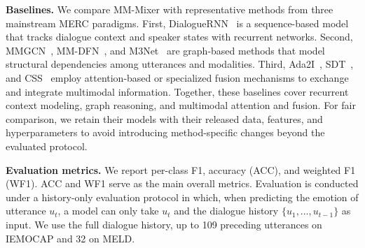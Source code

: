 \documentclass[letterpaper]{article} %
\begin{document}
\noindent\textbf{Baselines.}
We compare MM-Mixer with representative methods from three mainstream
MERC paradigms. First, DialogueRNN~\cite{dialoguernn} is a sequence-based model that tracks dialogue context and speaker states with recurrent networks. Second, MMGCN~\cite{mmgcn},
MM-DFN~\cite{mmdfn}, and M3Net~\cite{m3net} are graph-based methods that model structural dependencies among utterances and modalities. Third, Ada2I~\cite{ada2i}, SDT~\cite{sdt}, and CSS~\cite{css} employ attention-based or specialized fusion mechanisms to exchange and
integrate multimodal information. Together, these baselines cover recurrent context modeling, graph reasoning, and multimodal attention and fusion. For fair comparison, we retain their models with their released data, features, and hyperparameters to avoid introducing method-specific changes beyond the evaluated protocol.

\noindent\textbf{Evaluation metrics.}
We report per-class F1, accuracy (ACC), and weighted F1 (WF1). ACC and WF1 serve as the main overall metrics. Evaluation is conducted under a history-only evaluation protocol in which, when predicting the emotion of utterance $u_t$, a model can only take  $u_{t}$ and
the dialogue history $\{u_1,\ldots,u_{t-1}\}$ as input.
We use the full dialogue history, up to 109 preceding utterances on
IEMOCAP and 32 on MELD.
\end{document}
